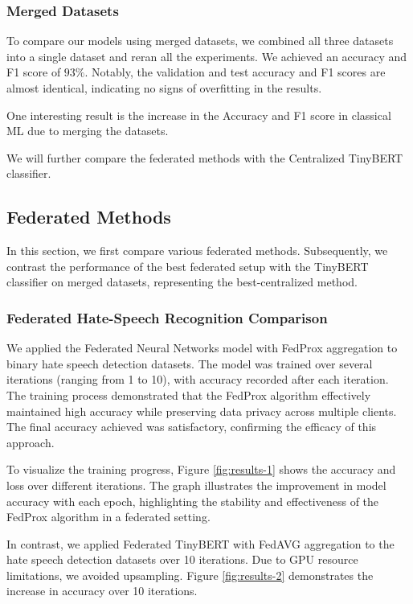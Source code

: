 \documentclass[11pt]{article}
\begin{document}
\subsubsection{Merged Datasets}
To compare our models using merged datasets, we combined all three datasets into a single dataset and reran all the experiments. We achieved an accuracy and F1 score of $93\%$. Notably, the validation and test accuracy and F1 scores are almost identical, indicating no signs of overfitting in the results.

One interesting result is the increase in the Accuracy and F1 score in classical ML due to merging the datasets.

We will further compare the federated methods with the Centralized TinyBERT classifier.




\subsection{Federated Methods}
In this section, we first compare various federated methods. Subsequently, we contrast the performance of the best federated setup with the TinyBERT classifier on merged datasets, representing the best-centralized method.



\subsubsection{Federated Hate-Speech Recognition Comparison}

We applied the Federated Neural Networks model with FedProx aggregation to binary hate speech detection datasets. The model was trained over several iterations (ranging from 1 to 10), with accuracy recorded after each iteration. The training process demonstrated that the FedProx algorithm effectively maintained high accuracy while preserving data privacy across multiple clients. The final accuracy achieved was satisfactory, confirming the efficacy of this approach.

To visualize the training progress, Figure \ref{fig:results-1} shows the accuracy and loss over different iterations. The graph illustrates the improvement in model accuracy with each epoch, highlighting the stability and effectiveness of the FedProx algorithm in a federated setting.

In contrast, we applied Federated TinyBERT with FedAVG aggregation to the hate speech detection datasets over 10 iterations. Due to GPU resource limitations, we avoided upsampling. Figure \ref{fig:results-2} demonstrates the increase in accuracy over 10 iterations.
\end{document}
